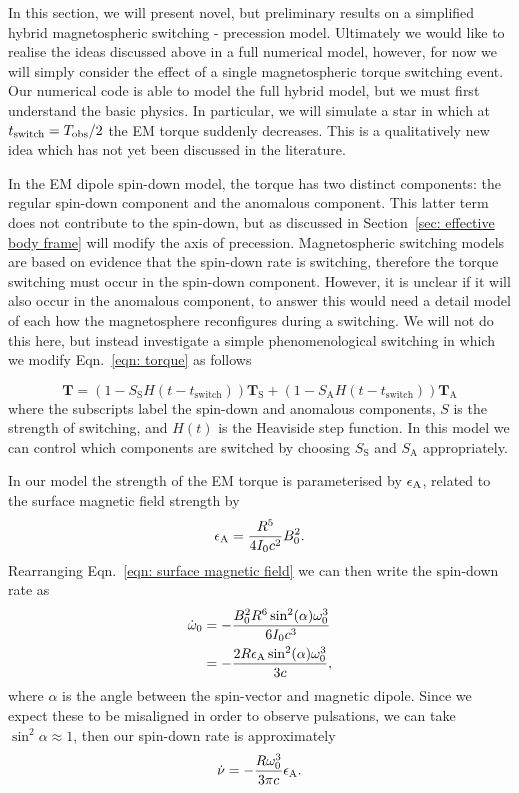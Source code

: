\documentclass[../full_thesis/full_thesis.tex]{subfiles}
\begin{document}
In this section, we will present novel, but preliminary results on a simplified
hybrid magnetospheric switching - precession model. Ultimately we would like to
realise the ideas discussed above in a full numerical model, however, for now
we will simply consider the effect of a single magnetospheric torque switching
event. Our numerical code is able to model the full hybrid model, but we must
first understand the basic physics. In particular, we will simulate a star in
which at $t_{\mathrm{switch}} = T_{\textrm{obs}}/2$ the EM torque suddenly decreases. This is
a qualitatively new idea which has not yet been discussed in the literature.

In the EM dipole spin-down model, the torque has two distinct components: the
regular spin-down component and the anomalous component. This latter term
does not contribute to the spin-down, but as discussed in Section~\ref{sec: effective
body frame} will modify the axis of precession. Magnetospheric switching models
are based on evidence that the spin-down rate is switching, therefore the torque
switching must occur in the spin-down component. However, it is unclear if it will
also occur in the anomalous component, to answer this would need a detail model
of each how the magnetosphere reconfigures during a switching. We will not do
this here, but instead investigate a simple phenomenological switching in which we
modify Eqn.~\eqref{eqn: torque} as follows
\newcommand{\Ss}{S_{\mathrm{S}}}
\newcommand{\Sa}{S_{\mathrm{A}}}

\begin{equation}
\mathbf{T} = (1 - \Ss H(t-t_{\mathrm{switch}})) \mathbf{T}_{\mathrm{S}}+
                 (1 - \Sa H(t-t_{\mathrm{switch}})) \mathbf{T}_{\mathrm{A}}
\label{eqn: single switch torque}
\end{equation}
where the subscripts label the spin-down and anomalous components, $S$ is the
strength of switching, and $H(t)$ is the Heaviside step function. In this model
we can control which components are switched by choosing $\Ss$ and $\Sa$
appropriately.

In our model the strength of the EM torque is parameterised
by $\epsilon_{\mathrm{A}}$, related to the surface magnetic field strength by
\begin{align}
    \epsilon_{\mathrm{A}} = \frac{R^{5}}{4I_{0} c^{2}} B_{0}^{2}.
\end{align}
Rearranging Eqn.~\eqref{eqn: surface magnetic field} we can then write the
spin-down rate as
\begin{align}
\begin{split}
    \dot{\omega}_{0} & = -\frac{B_{0}^{2}R^{6} \sin^{2}(\alpha) \omega_{0}^{3}}{6 I_{0} c^{3}} \\
    & = - \frac{2 R \epsilon_{\mathrm{A}} \sin^{2}(\alpha) \omega_{0}^{3}}{3 c},
\end{split}
\end{align}
where $\alpha$ is the angle between the spin-vector and magnetic dipole. Since
we expect these to be misaligned in order to observe pulsations, we can take
$\sin^{2}\alpha \approx 1$, then our spin-down rate is approximately
\begin{equation}
    \dot{\nu} = - \frac{R\omega_{0}^{3}}{3\pi c}\epsilon_{\mathrm{A}}.
    \label{eqn: spin-down of epsA}
\end{equation}
\end{document}
